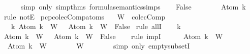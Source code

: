 \begin{isabellebody}
\ \ \ \ \isamarkupfalse%
\ {\isacharparenleft}simp\ only{\isacharcolon}\ simp{\isacharunderscore}thms{\isacharparenleft}{}{\isacharparenright}\ formula{\isacharunderscore}semantics{\isachardot}simps{\isacharparenleft}{}{\isacharparenright}{\isacharparenright}\isanewline
\ \ \isamarkupfalse%
\ {\isachardoublequoteopen}False{\isachardoublequoteclose}\isanewline
\ \ \ \ \isamarkupfalse%
\ {\isacartoucheopen}{\isasymA}\ {\isasymTurnstile}\ Atom\ k{\isacartoucheclose}\ \isamarkupfalse%
\ {\isacharparenleft}rule\ notE{\isacharparenright}\isanewline
{}\isamarkupfalse%
%
\endisatagproof
{\isafoldproof}%
%
\isadelimproof
\isanewline
%
\endisadelimproof
\isanewline
{}\isamarkupfalse%
\ pcp{\isacharunderscore}colecComp{\isacharunderscore}atoms{\isacharcolon}\isanewline
\ \ \ {\isachardoublequoteopen}W\ {\isasymin}\ colecComp{\isachardoublequoteclose}\isanewline
\ \ \ {\isachardoublequoteopen}{\isasymforall}k{\isachardot}\ Atom\ k\ {\isasymin}\ W\ {\isasymlongrightarrow}\ \isactrlbold {\isasymnot}\ {\isacharparenleft}Atom\ k{\isacharparenright}\ {\isasymin}\ W\ {\isasymlongrightarrow}\ False{\isachardoublequoteclose}\isanewline
%
\isadelimproof
%
\endisadelimproof
%
\isatagproof
{}\isamarkupfalse%
\ {\isacharparenleft}rule\ allI{\isacharparenright}\isanewline
\ \ \isamarkupfalse%
\ k\isanewline
\ \ \isamarkupfalse%
\ {\isachardoublequoteopen}Atom\ k\ {\isasymin}\ W\ {\isasymlongrightarrow}\ \isactrlbold {\isasymnot}\ {\isacharparenleft}Atom\ k{\isacharparenright}\ {\isasymin}\ W\ {\isasymlongrightarrow}\ False{\isachardoublequoteclose}\isanewline
\ \ \isamarkupfalse%
\ {\isacharparenleft}rule\ impI{\isacharparenright}{\isacharplus}\isanewline
\ \ \ \ \isamarkupfalse%
\ {}{\isacharcolon}{\isachardoublequoteopen}Atom\ k\ {\isasymin}\ W{\isachardoublequoteclose}\isanewline
\ \ \ \ \isamarkupfalse%
\ {}{\isacharcolon}{\isachardoublequoteopen}\isactrlbold {\isasymnot}\ {\isacharparenleft}Atom\ k{\isacharparenright}\ {\isasymin}\ W{\isachardoublequoteclose}\isanewline
\ \ \ \ \isamarkupfalse%
\ {\isachardoublequoteopen}{\isacharbraceleft}{\isacharbraceright}\ {\isasymsubseteq}\ W{\isachardoublequoteclose}\isanewline
\ \ \ \ \ \ \isamarkupfalse%
\ {\isacharparenleft}simp\ only{\isacharcolon}\ empty{\isacharunderscore}subsetI{\isacharparenright}\ \isanewline
\ \ \ \ \isamarkupfalse%

\end{isabellebody}
